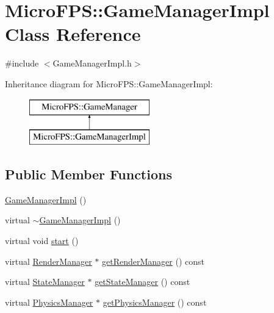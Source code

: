 \hypertarget{class_micro_f_p_s_1_1_game_manager_impl}{
\section{MicroFPS::GameManagerImpl Class Reference}
\label{d8/daa/class_micro_f_p_s_1_1_game_manager_impl}
}


{\ttfamily \#include $<$GameManagerImpl.h$>$}

Inheritance diagram for MicroFPS::GameManagerImpl:\begin{figure}[H]
\begin{center}
\leavevmode
\includegraphics[height=2.000000cm]{d8/daa/class_micro_f_p_s_1_1_game_manager_impl}
\end{center}
\end{figure}
\subsection*{Public Member Functions}
\begin{DoxyCompactItemize}
\item 
\hyperlink{class_micro_f_p_s_1_1_game_manager_impl_a6408c200462f62b1ed86521b90c85b27}{GameManagerImpl} ()
\item 
virtual \hyperlink{class_micro_f_p_s_1_1_game_manager_impl_a8479ea0ec07612cefcadd46d10429866}{$\sim$GameManagerImpl} ()
\item 
virtual void \hyperlink{class_micro_f_p_s_1_1_game_manager_impl_a408a6e2b5f22501b662cfd65c6437135}{start} ()
\item 
virtual \hyperlink{class_micro_f_p_s_1_1_render_manager}{RenderManager} $\ast$ \hyperlink{class_micro_f_p_s_1_1_game_manager_impl_a8d6c455d801f35c335c6648ecc2adb66}{getRenderManager} () const 
\item 
virtual \hyperlink{class_micro_f_p_s_1_1_state_manager}{StateManager} $\ast$ \hyperlink{class_micro_f_p_s_1_1_game_manager_impl_aeb67fb518616ef72d0f7b252d15908c4}{getStateManager} () const 
\item 
virtual \hyperlink{class_micro_f_p_s_1_1_physics_manager}{PhysicsManager} $\ast$ \hyperlink{class_micro_f_p_s_1_1_game_manager_impl_af22a0a2d254220f1be1b0a92963d641e}{getPhysicsManager} () const 
\end{DoxyCompactItemize}


